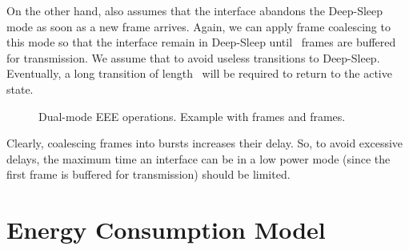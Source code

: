 \documentclass[journal,10pt,letterpaper]{IEEEtran}
\begin{document}
On the other hand, \cite{mostowfi15:dual_mode_eee} also assumes that
the interface abandons the Deep-Sleep mode as soon as a new frame
arrives. Again, we can apply frame coalescing to this mode so that the
interface remain in Deep-Sleep until ~frames are
buffered for transmission. We assume that  to avoid useless transitions to
Deep-Sleep. Eventually, a long transition of
length~ will be required to return to the active
state.



\begin{figure*}[t]
  \centering
  \caption{Dual-mode EEE operations. Example with frames and frames.}
  \label{fig:coalescing}
\end{figure*}

Clearly, coalescing frames into bursts increases their delay. So, to
avoid excessive delays, the maximum time an interface can be in a low
power mode (since the first frame is buffered for transmission) should
be limited.

\section{Energy Consumption Model}
\label{sec:energy_model}
\end{document}
